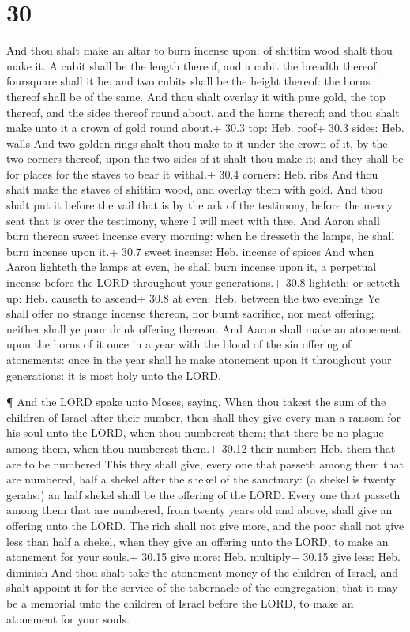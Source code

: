 \hypertarget{section-29}{%
\section{30}\label{section-29}}

 And thou shalt make an altar to burn incense upon: of
shittim wood shalt thou make it.  A cubit shall be the
length thereof, and a cubit the breadth thereof; foursquare shall it be:
and two cubits shall be the height thereof: the horns thereof shall be
of the same.  And thou shalt overlay it with pure gold, the
top thereof, and the sides thereof round about, and the horns thereof;
and thou shalt make unto it a crown of gold round about.+ 30.3 top: Heb.
roof+ 30.3 sides: Heb. walls  And two golden rings shalt
thou make to it under the crown of it, by the two corners thereof, upon
the two sides of it shalt thou make it; and they shall be for places for
the staves to bear it withal.+ 30.4 corners: Heb. ribs  And
thou shalt make the staves of shittim wood, and overlay them with gold.
 And thou shalt put it before the vail that is by the ark of
the testimony, before the mercy seat that is over the testimony, where I
will meet with thee.  And Aaron shall burn thereon sweet
incense every morning: when he dresseth the lamps, he shall burn incense
upon it.+ 30.7 sweet incense: Heb. incense of spices  And
when Aaron lighteth the lamps at even, he shall burn incense upon it, a
perpetual incense before the LORD throughout your generations.+ 30.8
lighteth: or setteth up: Heb. causeth to ascend+ 30.8 at even: Heb.
between the two evenings  Ye shall offer no strange incense
thereon, nor burnt sacrifice, nor meat offering; neither shall ye pour
drink offering thereon.  And Aaron shall make an atonement
upon the horns of it once in a year with the blood of the sin offering
of atonements: once in the year shall he make atonement upon it
throughout your generations: it is most holy unto the LORD.

 ¶ And the LORD spake unto Moses, saying, 
When thou takest the sum of the children of Israel after their number,
then shall they give every man a ransom for his soul unto the LORD, when
thou numberest them; that there be no plague among them, when thou
numberest them.+ 30.12 their number: Heb. them that are to be numbered
 This they shall give, every one that passeth among them
that are numbered, half a shekel after the shekel of the sanctuary: (a
shekel is twenty gerahs:) an half shekel shall be the offering of the
LORD.  Every one that passeth among them that are numbered,
from twenty years old and above, shall give an offering unto the LORD.
 The rich shall not give more, and the poor shall not give
less than half a shekel, when they give an offering unto the LORD, to
make an atonement for your souls.+ 30.15 give more: Heb. multiply+ 30.15
give less: Heb. diminish  And thou shalt take the atonement
money of the children of Israel, and shalt appoint it for the service of
the tabernacle of the congregation; that it may be a memorial unto the
children of Israel before the LORD, to make an atonement for your souls.

